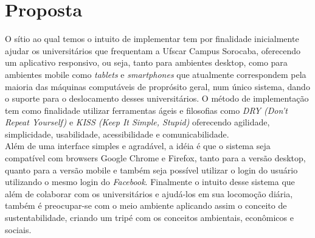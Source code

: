 \documentclass{sig-alternate}
\begin{document}
\section{Proposta}
O sítio ao qual temos o intuito de implementar tem por finalidade inicialmente 
ajudar os universitários que frequentam a Ufscar Campus Sorocaba, oferecendo 
um aplicativo responsivo, ou seja, tanto para ambientes desktop, como para 
ambientes mobile como {\it tablets} e {\it smartphones} que atualmente 
correspondem pela maioria das máquinas computáveis de proprósito geral, 
num único sistema, dando o suporte para o deslocamento desses universitários.
O método de implementação tem como finalidade utilizar ferramentas ágeis e 
filosofias como {\it DRY (Don't Repeat Yourself)} e {\it KISS (Keep It Simple, Stupid)} 
oferecendo agilidade, simplicidade, usabilidade, acessibilidade e comunicabilidade.\\
Além de uma interface simples e agradável, a idéia é que o sistema seja 
compatível com browsers Google Chrome e Firefox, tanto para a versão desktop, 
quanto para a versão mobile e também seja possível utilizar o login do 
usuário utilizando o mesmo login do {\it Facebook}. Finalmente o intuito 
desse sistema que além de colaborar com os universitários e ajudá-los em sua 
locomoção diária, também é preocupar-se com o meio ambiente aplicando assim 
o conceito de sustentabilidade, criando um tripé com os conceitos ambientais, 
econômicos e sociais.
%

%
%
\end{document}
